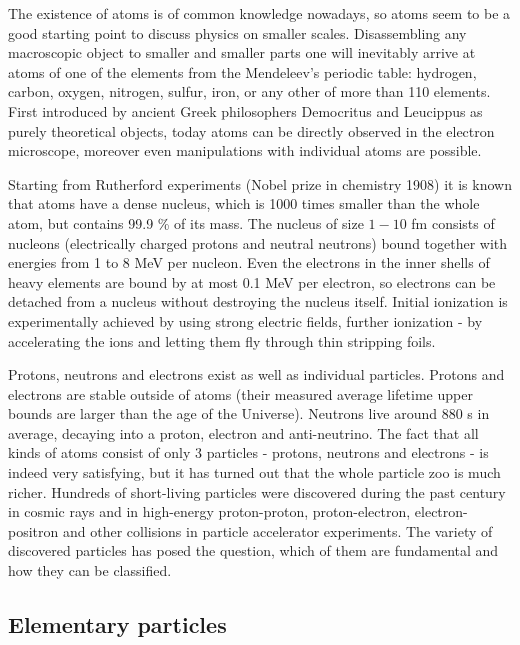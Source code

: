 The existence of atoms is of common knowledge nowadays, so atoms seem to be a
good starting point to discuss physics on smaller scales. Disassembling any
macroscopic object to smaller and smaller parts one will inevitably
arrive at atoms of one of the elements from the Mendeleev's periodic table:
hydrogen, carbon, oxygen, nitrogen, sulfur, iron, or any other of more than
110 elements. First introduced by ancient Greek philosophers Democritus and
Leucippus as purely theoretical objects, today atoms can be directly observed
in the electron microscope, moreover even manipulations with individual atoms
are possible.

Starting from Rutherford experiments (Nobel prize in chemistry 1908) it is
known that atoms have a dense nucleus, which is 1000 times smaller than the
whole atom, but contains 99.9 \% of its mass. The nucleus of size $1 -
10$ fm consists of nucleons (electrically charged protons and neutral
neutrons) bound together with energies from 1 to 8 MeV per nucleon.
Even the electrons in the inner shells of heavy elements are bound by at most
0.1 MeV per electron, so electrons can be detached from a nucleus
without destroying the nucleus itself. Initial ionization is experimentally
achieved by using strong electric fields, further ionization - by accelerating
the ions and letting them fly through thin stripping foils.

Protons, neutrons and electrons exist as well as individual particles.
Protons and electrons are stable outside of atoms (their measured average lifetime
upper bounds are larger than the age of the Universe).  Neutrons live around
880 s in average, decaying into a proton, electron and anti-neutrino. The
fact that all kinds of atoms consist of only 3 particles -
protons, neutrons and electrons - is indeed very satisfying, but it has turned
out that the whole particle zoo is much richer. Hundreds of short-living
particles were discovered during the past century in cosmic rays and in
high-energy proton-proton, proton-electron, electron-positron and other
collisions in particle accelerator experiments. The variety of discovered
particles has posed the question, which of them are fundamental and how they
can be classified.

\subsection{Elementary particles}

